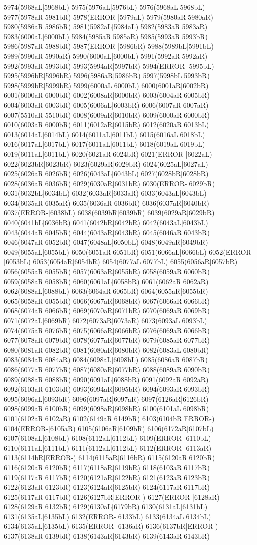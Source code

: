 5974(5968aL|5968bL) 5975(5976aL|5976bL) 5976(5968aL|5968bL) 5977(5978aR|5981bR) 5978(ERROR-|5979aL) 5979(5980aR|5980aR) 5980(5986aR|5986bR) 5981(5982aL|5984aL) 5982(5983aR|5983aR) 5983(6000aL|6000bL) 5984(5985aR|5985aR) 5985(5993aR|5993bR) 5986(5987aR|5988bR) 5987(ERROR-|5986bR) 5988(5989bL|5991bL) 5989(5990aR|5990aR) 5990(6000aL|6000bL) 5991(5992aR|5992aR) 5992(5993aR|5993bR) 5993(5994aR|5997bR) 5994(ERROR-|5995bL) 5995(5996bR|5996bR) 5996(5986aR|5986bR) 5997(5998bL|5993bR) 5998(5999bR|5999bR) 5999(6000aL|6000bL) 6000(6001aR|6002bR) 6001(6000aR|6000bR) 6002(6008aR|6000bR) 6003(6004aR|6005bR) 6004(6003aR|6003bR) 6005(6006aL|6003bR) 6006(6007aR|6007aR) 6007(5510aR|5510bR) 6008(6009aR|6010bR) 6009(6000aR|6000bR) 6010(6003aR|6000bR) 6011(6012aR|6015bR) 6012(6020aR|6013bL) 6013(6014aL|6014bL) 6014(6011aL|6011bL) 6015(6016aL|6018bL) 6016(6017aL|6017bL) 6017(6011aL|6011bL) 6018(6019aL|6019bL) 6019(6011aL|6011bL) 6020(6021aR|6024bR) 6021(ERROR-|6022aL) 6022(6023bR|6023bR) 6023(6029aR|6029bR) 6024(6025aL|6027aL) 6025(6026aR|6026bR) 6026(6043aL|6043bL) 6027(6028bR|6028bR) 6028(6036aR|6036bR) 6029(6030aR|6031bR) 6030(ERROR-|6029bR) 6031(6032bL|6034bL) 6032(6033aR|6033aR) 6033(6043aL|6043bL) 6034(6035aR|6035aR) 6035(6036aR|6036bR) 6036(6037aR|6040bR) 6037(ERROR-|6038bL) 6038(6039bR|6039bR) 6039(6029aR|6029bR) 6040(6041bL|6036bR) 6041(6042bR|6042bR) 6042(6043aL|6043bL) 6043(6044aR|6045bR) 6044(6043aR|6043bR) 6045(6046aR|6043bR) 6046(6047aR|6052bR) 6047(6048aL|6050bL) 6048(6049aR|6049bR) 6049(6055aL|6055bL) 6050(6051aR|6051bR) 6051(6066aL|6066bL) 6052(ERROR-|6053bL) 6053(6054aR|6054bR) 6054(6077aL|6077bL) 6055(6056aR|6057bR) 6056(6055aR|6055bR) 6057(6063aR|6055bR) 6058(6059aR|6060bR) 6059(6058aR|6058bR) 6060(6061aL|6058bR) 6061(6062aR|6062aR) 6062(6088aL|6088bL) 6063(6064aR|6065bR) 6064(6055aR|6055bR) 6065(6058aR|6055bR) 6066(6067aR|6068bR) 6067(6066aR|6066bR) 6068(6074aR|6066bR) 6069(6070aR|6071bR) 6070(6069aR|6069bR) 6071(6072aL|6069bR) 6072(6073aR|6073aR) 6073(6093aL|6093bL) 6074(6075aR|6076bR) 6075(6066aR|6066bR) 6076(6069aR|6066bR) 6077(6078aR|6079bR) 6078(6077aR|6077bR) 6079(6085aR|6077bR) 6080(6081aR|6082bR) 6081(6080aR|6080bR) 6082(6083aL|6080bR) 6083(6084aR|6084aR) 6084(6098aL|6098bL) 6085(6086aR|6087bR) 6086(6077aR|6077bR) 6087(6080aR|6077bR) 6088(6089aR|6090bR) 6089(6088aR|6088bR) 6090(6091aL|6088bR) 6091(6092aR|6092aR) 6092(6103aR|6103bR) 6093(6094aR|6095bR) 6094(6093aR|6093bR) 6095(6096aL|6093bR) 6096(6097aR|6097aR) 6097(6126aR|6126bR) 6098(6099aR|6100bR) 6099(6098aR|6098bR) 6100(6101aL|6098bR) 6101(6102aR|6102aR) 6102(6149aR|6149bR) 6103(6104bR|ERROR-) 6104(ERROR-|6105aR) 6105(6106aR|6109bR) 6106(6172aR|6107bL) 6107(6108aL|6108bL) 6108(6112aL|6112bL) 6109(ERROR-|6110bL) 6110(6111aL|6111bL) 6111(6112aL|6112bL) 6112(ERROR-|6113aR) 6113(6114bR|ERROR-) 6114(6115aR|6116bR) 6115(6120aR|6120bR) 6116(6120aR|6120bR) 6117(6118aR|6119bR) 6118(6103aR|6117bR) 6119(6117aR|6117bR) 6120(6121aR|6122bR) 6121(6123aR|6123bR) 6122(6123aR|6123bR) 6123(6124aR|6125bR) 6124(6117aR|6117bR) 6125(6117aR|6117bR) 6126(6127bR|ERROR-) 6127(ERROR-|6128aR) 6128(6129aR|6132bR) 6129(6130aL|6179bR) 6130(6131aL|6131bL) 6131(6135aL|6135bL) 6132(ERROR-|6133bL) 6133(6134aL|6134bL) 6134(6135aL|6135bL) 6135(ERROR-|6136aR) 6136(6137bR|ERROR-) 6137(6138aR|6139bR) 6138(6143aR|6143bR) 6139(6143aR|6143bR) 